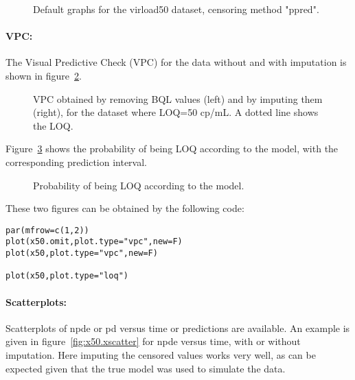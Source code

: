 \clearpage
\begin{figure}[!h]
\par\kern -0.5cm
\begin{center}
\end{center}
\par\kern -0.5cm
\caption{Default graphs for the virload50 dataset, censoring method {\sf "ppred"}.}\label{fig:x50.ppred}
\end{figure}

\paragraph{VPC:} The Visual Predictive Check (VPC) for the data without and with imputation is shown in figure~\ref{fig:x50.vpc}.

\begin{figure}[!h]
\par\kern -1cm
\begin{center}
\end{center}
\par\kern -6.5cm
\caption{VPC obtained by removing BQL values (left) and by imputing them (right), for the dataset where LOQ=50 cp/mL. A dotted line shows the LOQ.}\label{fig:x50.vpc}
\end{figure}
\clearpage

Figure~\ref{fig:x50.ploq} shows the probability of being LOQ according to the model, with the corresponding prediction interval.
\begin{figure}[!h]
\par\kern -0.3cm
\begin{center}
\end{center}
\caption{Probability of being LOQ according to the model.}\label{fig:x50.ploq}
\end{figure}

These two figures can be obtained by the following code:
\begin{verbatim}
par(mfrow=c(1,2))
plot(x50.omit,plot.type="vpc",new=F)
plot(x50,plot.type="vpc",new=F)

plot(x50,plot.type="loq")
\end{verbatim} 

\clearpage
\paragraph{Scatterplots:} Scatterplots of npde or pd versus time or predictions are available. An example is given in figure~\ref{fig:x50.xscatter} for npde versus time, with or without imputation. Here imputing the censored values works very well, as can be expected given that the true model was used to simulate the data.

